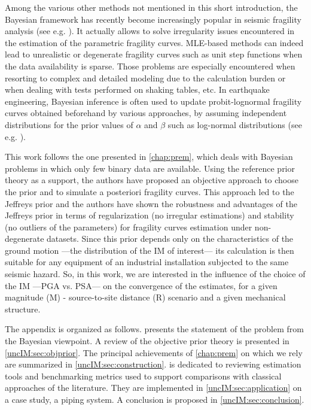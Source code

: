 Among the various other methods not mentioned in this short introduction, the Bayesian framework has recently become increasingly popular in seismic fragility analysis (see e.g. \cite{gardoni_probabilistic_2002,wang_seismic_2018,katayama_bayesian-estimation-based_2021,koutsourelakis_assessing_2010,damblin_approche_2014,tadinada_structural_2017,kwag_computationally_2018,jeon_parameterized_2019,tabandeh_physics-based_2020}). 
It actually allows to solve irregularity issues encountered in the estimation of the parametric fragility curves. MLE-based methods can indeed lead to unrealistic or degenerate fragility curves such as unit step functions when the data availability is sparse. Those problems are especially encountered when resorting to complex and detailed modeling due to the calculation burden or when dealing with tests performed on shaking tables, etc. In earthquake engineering, Bayesian inference is often used to update probit-lognormal fragility curves obtained beforehand by various approaches, by assuming independent distributions for the prior values of $\alpha$ and $\beta$ such as log-normal distributions (see e.g. \cite{tadinada_structural_2017,kwag_computationally_2018,wang_seismic_2018,katayama_bayesian-estimation-based_2021,straub_improved_2008}).

This work follows the one presented in \cref{chap:prem}, which deals with Bayesian problems in which only few binary data are available. Using the reference prior theory as a support, the authors have proposed an objective approach to choose the prior and to simulate a posteriori fragility curves. This approach led to the Jeffreys prior and the authors have shown the robustness and advantages of the Jeffreys prior in terms of regularization (no irregular estimations) and stability (no outliers of the parameters) for fragility curves estimation under non-degenerate datasets. Since this prior depends only on the characteristics of the ground motion ---the distribution of the IM of interest--- its calculation is then suitable for any equipment of an industrial installation subjected to the same seismic hazard. So, in this work, we are interested in the influence of the choice of the IM ---PGA vs. PSA--- on the convergence of the estimates, for a given magnitude (M) - source-to-site distance (R) scenario and a given mechanical structure.

The appendix is organized as follows.  presents the statement of the problem from the Bayesian viewpoint. A review of the objective prior theory is presented in \cref{uncIM:sec:objprior}. The principal achievements of \cref{chap:prem} on which we rely are summarized in \cref{uncIM:sec:construction}.  is dedicated to reviewing estimation tools and benchmarking metrics used to support comparisons with classical approaches of the literature. They are implemented in \cref{uncIM:sec:application} on a case study, a piping system. A conclusion is proposed in \cref{uncIM:sec:conclusion}.





